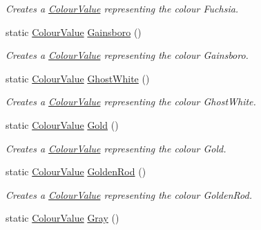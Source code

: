 \begin{DoxyCompactItemize}
\begin{DoxyCompactList}\small\item\em Creates a \hyperlink{classMezzanine_1_1ColourValue}{ColourValue} representing the colour Fuchsia. \item\end{DoxyCompactList}\item 
static \hyperlink{classMezzanine_1_1ColourValue}{ColourValue} \hyperlink{classMezzanine_1_1ColourValue_aaa896b999423230f3d21b5299c74fa84}{Gainsboro} ()
\begin{DoxyCompactList}\small\item\em Creates a \hyperlink{classMezzanine_1_1ColourValue}{ColourValue} representing the colour Gainsboro. \item\end{DoxyCompactList}\item 
static \hyperlink{classMezzanine_1_1ColourValue}{ColourValue} \hyperlink{classMezzanine_1_1ColourValue_ad50e196521af96d11bf210181096ee7d}{GhostWhite} ()
\begin{DoxyCompactList}\small\item\em Creates a \hyperlink{classMezzanine_1_1ColourValue}{ColourValue} representing the colour GhostWhite. \item\end{DoxyCompactList}\item 
static \hyperlink{classMezzanine_1_1ColourValue}{ColourValue} \hyperlink{classMezzanine_1_1ColourValue_a4115c14924635955d8212e99adc0b649}{Gold} ()
\begin{DoxyCompactList}\small\item\em Creates a \hyperlink{classMezzanine_1_1ColourValue}{ColourValue} representing the colour Gold. \item\end{DoxyCompactList}\item 
static \hyperlink{classMezzanine_1_1ColourValue}{ColourValue} \hyperlink{classMezzanine_1_1ColourValue_aec2d984373e216a6992ba0d95ce782f0}{GoldenRod} ()
\begin{DoxyCompactList}\small\item\em Creates a \hyperlink{classMezzanine_1_1ColourValue}{ColourValue} representing the colour GoldenRod. \item\end{DoxyCompactList}\item 
static \hyperlink{classMezzanine_1_1ColourValue}{ColourValue} \hyperlink{classMezzanine_1_1ColourValue_a3a5080180297fa81e6bc6bd4a38d38c7}{Gray} ()

\end{DoxyCompactItemize}

